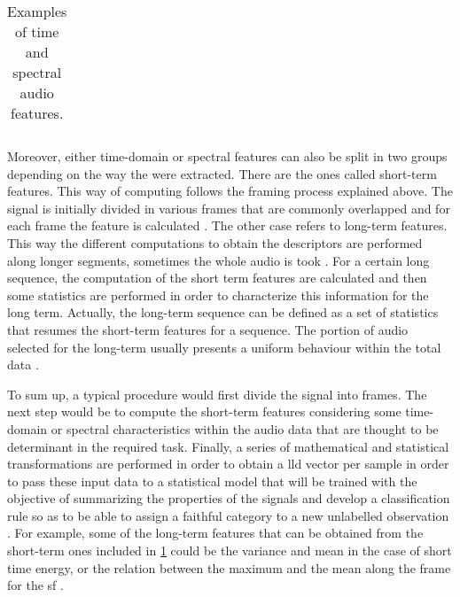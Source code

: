 \begin{table}[h!]
\begin{center}
\begin{tabular}{|| m{9em} | m{24em} ||}
				\hline
			\end{tabular}
		\end{center}
		\caption{Examples of time  and spectral audio features.}
		\label{table:6}
	\end{table}

	Moreover, either time-domain or spectral features can also be split in two groups depending on the way the were extracted. There are the ones called short-term features. This way of computing follows the framing process explained above. The signal is initially divided in various frames that are commonly overlapped and for each frame the feature is calculated \cite{Giannakopoulos2014}. The other case refers to long-term features. This way the different computations to obtain the descriptors are performed along longer segments, sometimes the whole audio is took \cite{BUYUK2018}. For a certain long sequence, the computation of the short term features are calculated and then some statistics are performed in order to characterize this information for the long term. Actually, the long-term sequence can be defined as a set of statistics that resumes the short-term features for a sequence. The portion of audio selected for the long-term usually presents a uniform behaviour within the total data \cite{Giannakopoulos2014}.

	To sum up, a typical procedure would first divide the signal into frames. The next step would be to compute the short-term features considering some time-domain or spectral characteristics within the audio data that are thought to be determinant in the required task. Finally, a series of mathematical and statistical transformations are performed in order to obtain a \acrshort{lld} vector per sample in order to pass these input data to a statistical model that will be trained with the objective of summarizing the properties of the signals and develop a classification rule so as to be able to assign a faithful category to a new unlabelled observation \cite{Stowell2015}. For example, some of the long-term features that can be obtained from the short-term ones included in \ref{table:6} could be the variance and mean in the case of short time energy, or the relation between the maximum and the mean along the frame for the \acrshort{sf} \cite{Giannakopoulos2006}.
	
		
